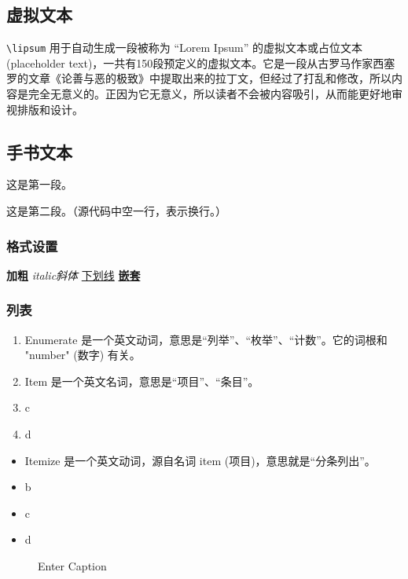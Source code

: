 \documentclass{ctexart}
\begin{document}
\subsection{虚拟文本}
\lstinline|\lipsum| 用于自动生成一段被称为 “Lorem Ipsum” 的虚拟文本或占位文本 (placeholder text)，一共有150段预定义的虚拟文本。它是一段从古罗马作家西塞罗的文章《论善与恶的极致》中提取出来的拉丁文，但经过了打乱和修改，所以内容是完全无意义的。正因为它无意义，所以读者不会被内容吸引，从而能更好地审视排版和设计。

\lipsum[1] %

\subsection{手书文本}
这是第一段。

这是第二段。（源代码中空一行，表示换行。）

\subsubsection{格式设置}
\textbf{加粗} \textit{italic斜体} \underline{下划线} \underline{\textbf{嵌套}}


\subsubsection{列表}
\begin{enumerate} %
    \item Enumerate 是一个英文动词，意思是“列举”、“枚举”、“计数”。它的词根和 "number" (数字) 有关。
    \item Item 是一个英文名词，意思是“项目”、“条目”。
    \item c
    \item d
\end{enumerate}

\begin{itemize} %
    \item Itemize 是一个英文动词，源自名词 item (项目)，意思就是“分条列出”。
    \item b
    \item c
    \item d
\end{itemize}


\begin{figure}[h] %
    \centering %
    \caption{Enter Caption}
    \label{fig:enter-label}
\end{figure}
\end{document}
